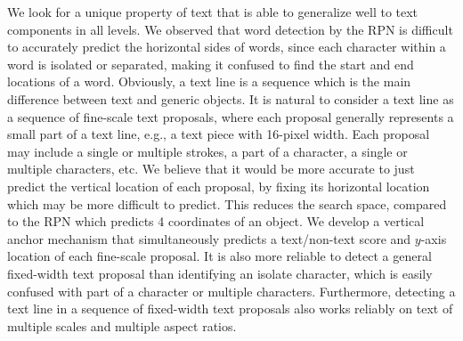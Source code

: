 \documentclass[runningheads]{llncs}
\begin{document}
We look for a unique property of text that is able to generalize well to text components in all levels. 
We observed that word detection by the RPN is difficult to accurately predict the horizontal sides of words, since each character within a word is isolated or separated, making it confused to find the start and end locations of a word. 
Obviously, a text line is  a sequence which is the main difference between text and generic objects.  It is natural to consider a text line as a sequence of fine-scale text proposals, where each proposal  generally  represents a small part of a text line, e.g., a text piece with 16-pixel width. Each proposal may include a single or multiple strokes, a part of a character, a single or multiple characters, etc. 
We believe that it would be more accurate to just predict the vertical location of each proposal, by fixing its horizontal location which may be more difficult to predict.
This reduces the search space, compared to the RPN which predicts 4 coordinates of an object. 
We develop a vertical anchor mechanism that simultaneously predicts a text/non-text score and $y$-axis location of each fine-scale proposal. It is also more reliable to detect a general fixed-width text proposal than identifying  an isolate character, which is easily confused with part of a character or multiple characters.  Furthermore, detecting a text line in a sequence of fixed-width text proposals also works reliably on text of  multiple scales and multiple aspect ratios.
\end{document}
